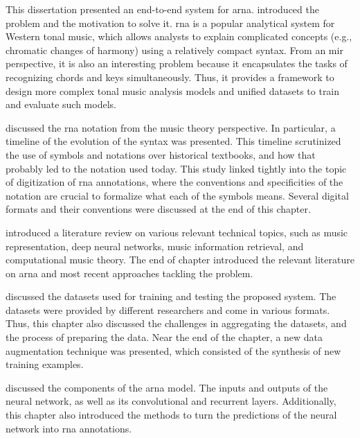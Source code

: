
This dissertation presented an end-to-end system for
\gls{arna}.  introduced the problem
and the motivation to solve it. \gls{rna} is a popular
analytical system for Western tonal music, which allows
analysts to explain complicated concepts (e.g., chromatic
changes of harmony) using a relatively compact syntax. From
an \gls{mir} perspective, it is also an interesting problem
because it encapsulates the tasks of recognizing chords and
keys simultaneously. Thus, it provides a framework to design
more complex tonal music analysis models and unified
datasets to train and evaluate such models.

 discussed the
\gls{rna} notation from the music theory perspective. In
particular, a timeline of the evolution of the syntax was
presented. This timeline scrutinized the use of symbols and
notations over historical textbooks, and how that probably
led to the notation used today. This study linked tightly
into the topic of digitization of \gls{rna} annotations,
where the conventions and specificities of the notation are
crucial to formalize what each of the symbols means. Several
digital formats and their conventions were discussed at the
end of this chapter.

 introduced a literature review on
various relevant technical topics, such as music
representation, deep neural networks, music information
retrieval, and computational music theory. The end of
chapter introduced the relevant literature on \gls{arna} and
most recent approaches tackling the problem.

 discussed the
datasets used for training and testing the proposed system.
The datasets were provided by different researchers and come
in various formats. Thus, this chapter also discussed the
challenges in aggregating the datasets, and the process of
preparing the data. Near the end of the chapter, a new data
augmentation technique was presented, which consisted of the
synthesis of new training examples.

 discussed the components of the
\gls{arna} model. The inputs and outputs of the neural
network, as well as its convolutional and recurrent layers.
Additionally, this chapter also introduced the methods to
turn the predictions of the neural network into \gls{rna}
annotations.

